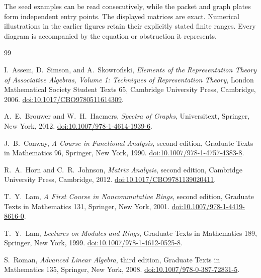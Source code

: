 \documentclass[11pt]{article}
\theoremstyle{definition}
\theoremstyle{remark}
\theoremstyle{definition}\newtheorem{example}[theorem]{Example}
\begin{document}
The seed examples can be read consecutively, while the packet and graph plates form independent entry points. The displayed matrices are exact. Numerical illustrations in the earlier figures retain their explicitly stated finite ranges. Every diagram is accompanied by the equation or obstruction it represents.
\begingroup\fontsize{10.2}{11.6}\selectfont{}\setlength{\parindent}{0pt}\setlength{\parskip}{2pt}\setlength{\abovedisplayskip}{7pt}\setlength{\belowdisplayskip}{7pt}\endgroup

\clearpage
\begin{thebibliography}{99}

I.~Assem, D.~Simson, and A.~Skowro{\'n}ski,
\emph{Elements of the Representation Theory of Associative Algebras, Volume 1: Techniques of Representation Theory},
London Mathematical Society Student Texts 65,
Cambridge University Press, Cambridge, 2006.
\href{https://doi.org/10.1017/CBO9780511614309}{doi:10.1017/CBO9780511614309}.

A.~E.~Brouwer and W.~H.~Haemers,
\emph{Spectra of Graphs},
Universitext, Springer, New York, 2012.
\href{https://doi.org/10.1007/978-1-4614-1939-6}{doi:10.1007/978-1-4614-1939-6}.

J.~B.~Conway,
\emph{A Course in Functional Analysis},
second edition, Graduate Texts in Mathematics 96,
Springer, New York, 1990.
\href{https://doi.org/10.1007/978-1-4757-4383-8}{doi:10.1007/978-1-4757-4383-8}.

R.~A.~Horn and C.~R.~Johnson,
\emph{Matrix Analysis},
second edition, Cambridge University Press, Cambridge, 2012.
\href{https://doi.org/10.1017/CBO9781139020411}{doi:10.1017/CBO9781139020411}.

T.~Y.~Lam,
\emph{A First Course in Noncommutative Rings},
second edition, Graduate Texts in Mathematics 131,
Springer, New York, 2001.
\href{https://doi.org/10.1007/978-1-4419-8616-0}{doi:10.1007/978-1-4419-8616-0}.

T.~Y.~Lam,
\emph{Lectures on Modules and Rings},
Graduate Texts in Mathematics 189,
Springer, New York, 1999.
\href{https://doi.org/10.1007/978-1-4612-0525-8}{doi:10.1007/978-1-4612-0525-8}.

S.~Roman,
\emph{Advanced Linear Algebra},
third edition, Graduate Texts in Mathematics 135,
Springer, New York, 2008.
\href{https://doi.org/10.1007/978-0-387-72831-5}{doi:10.1007/978-0-387-72831-5}.


\end{thebibliography}
\end{document}

